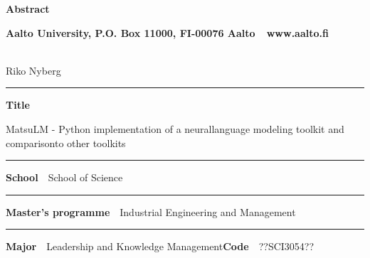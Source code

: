 
\newpage
{}
{}


\begin{spacing}{.88}

{\parindent0pt %

{\fontsize{13.9pt}{13.9pt}\selectfont
\vspace{-8.9mm}\hfill{\bfseries\sffamily\lsstyle Abstract}}

{\fontsize{9.48pt}{9.48pt}\selectfont
\vspace{.9mm}\hfill{\bfseries\sffamily\lsstyle Aalto University, P.O. Box 11000, FI-00076 Aalto~~\textcolor{aaltoGray}{www.aalto.fi}}}

\\
{\small Riko Nyberg}

\vspace{-2.4mm}\rule{\textwidth}{.75pt}

{\fontsize{10.5pt}{10.5pt}\bfseries\sffamily\lsstyle Title}\\
\parbox[t]{\textwidth}{\raggedright\small MatsuLM - Python implementation of a neurallanguage modeling toolkit and comparisonto other toolkits}

\vspace{.5mm}\rule{\textwidth}{.75pt}

{\fontsize{10.5pt}{10.5pt}\bfseries\sffamily\lsstyle School}~~{\small School of Science}

\vspace{-2.4mm}\rule{\textwidth}{.75pt}

{\fontsize{10.5pt}{10.5pt}\bfseries\sffamily\lsstyle Master's programme}~~{\small Industrial Engineering and Management}

\vspace{-2.4mm}\rule{\textwidth}{.75pt}

{\fontsize{10.5pt}{10.5pt}\bfseries\sffamily\lsstyle Major}~~{\small Leadership and Knowledge Management}\hfill{\fontsize{10.5pt}{10.5pt}\bfseries\sffamily\lsstyle Code}~~{\small ??SCI3054??}

}
\end{spacing}
